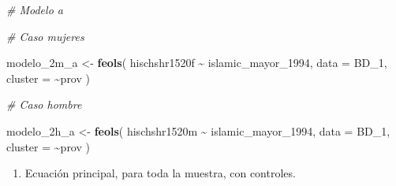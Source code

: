 \documentclass[
]{article}
\newenvironment{Shaded}{\begin{snugshade}}{\end{snugshade}}
\newcommand{\AttributeTok}[1]{\textcolor[rgb]{0.13,0.29,0.53}{#1}}
\newcommand{\CommentTok}[1]{\textcolor[rgb]{0.56,0.35,0.01}{\textit{#1}}}
\newcommand{\FunctionTok}[1]{\textcolor[rgb]{0.13,0.29,0.53}{\textbf{#1}}}
\newcommand{\NormalTok}[1]{#1}
\newcommand{\OtherTok}[1]{\textcolor[rgb]{0.56,0.35,0.01}{#1}}
\newcommand{\SpecialCharTok}[1]{\textcolor[rgb]{0.81,0.36,0.00}{\textbf{#1}}}
\providecommand{\tightlist}{%
  \setlength{\itemsep}{0pt}\setlength{\parskip}{0pt}}
\begin{document}
\begin{Shaded}
\begin{Highlighting}[]
\CommentTok{\# Modelo a}

\CommentTok{\# Caso mujeres}

\NormalTok{modelo\_2m\_a }\OtherTok{\textless{}{-}} \FunctionTok{feols}\NormalTok{(}
\NormalTok{  hischshr1520f }\SpecialCharTok{\textasciitilde{}}\NormalTok{ islamic\_mayor\_1994,}
  \AttributeTok{data =}\NormalTok{ BD\_1,}
  \AttributeTok{cluster =} \SpecialCharTok{\textasciitilde{}}\NormalTok{prov}
\NormalTok{)}

\CommentTok{\# Caso hombre}

\NormalTok{modelo\_2h\_a }\OtherTok{\textless{}{-}} \FunctionTok{feols}\NormalTok{(}
\NormalTok{  hischshr1520m }\SpecialCharTok{\textasciitilde{}}\NormalTok{ islamic\_mayor\_1994,}
  \AttributeTok{data =}\NormalTok{ BD\_1,}
  \AttributeTok{cluster =} \SpecialCharTok{\textasciitilde{}}\NormalTok{prov}
\NormalTok{)}
\end{Highlighting}
\end{Shaded}

\begin{enumerate}
\def\labelenumi{\alph{enumi})}
\setcounter{enumi}{1}
\tightlist
\item
  Ecuación principal, para toda la muestra, con controles.
\end{enumerate}
\end{document}
